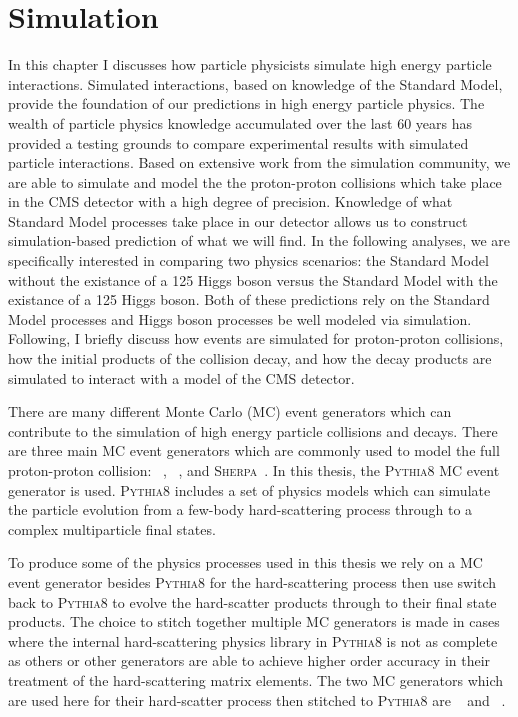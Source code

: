\chapter{Simulation}
\label{sec:simulation}
In this chapter I discusses how particle physicists simulate high energy particle
interactions. Simulated interactions, based on knowledge of the Standard Model, provide 
the foundation of our predictions in high energy particle physics. 
The wealth of particle physics knowledge accumulated over the last 
60 years has provided a testing grounds to compare experimental results with
simulated particle interactions. Based on extensive work from the simulation community,
we are able to simulate and model the the proton-proton collisions which take place in the
CMS detector with a high degree of precision. Knowledge of what Standard Model processes take place
in our detector allows us to construct simulation-based prediction of what we will find. In the following
analyses, we are specifically interested in comparing two physics scenarios: the Standard Model 
without the existance of a 125 \GeV Higgs boson versus the Standard Model with the existance
of a 125 \GeV Higgs boson. Both of these predictions rely on the Standard Model processes and
Higgs boson processes be well modeled via simulation.
Following, I briefly discuss how events are simulated for proton-proton collisions,
how the initial products of the collision decay, and how the decay products are simulated
to interact with a model of the CMS detector.

There are many different Monte Carlo (MC) event generators which can contribute to the 
simulation of high energy particle collisions and decays. There are three main MC event
generators which are commonly used to model the full proton-proton collision: 
\PYTHIA~\cite{Sjostrand:2014zea}, \HERWIG~\cite{Bahr:2008pv}, and \textsc{Sherpa}~\cite{Gleisberg:2008ta}. 
In this thesis, the \textsc{Pythia8} MC event generator is used. \textsc{Pythia8} includes a set of physics models
which can simulate the particle evolution from a few-body hard-scattering process through
to a complex multiparticle final states.

To produce some of the physics processes used in this
thesis we rely on a MC event generator besides \textsc{Pythia8} for the hard-scattering process 
then use switch back to \textsc{Pythia8} to evolve the hard-scatter products through 
to their final state products. The
choice to stitch together multiple MC generators is made in cases where the internal
hard-scattering physics library in \textsc{Pythia8} is not as complete as others or other
generators are able to achieve higher order accuracy in their treatment of the
hard-scattering matrix elements. The two MC generators which are used here for their hard-scatter
process then stitched to \textsc{Pythia8} are \POWHEG~\cite{Alioli:2010xd} and 
\MGAMCNLO~\cite{Alwall:2011uj,Alwall:2014hca}.

